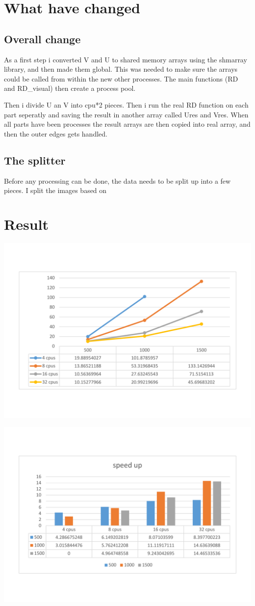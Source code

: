 \documentclass{Article}
\begin{document}
\section{What have changed}
\subsection*{Overall change}
As a first step i converted V and U to shared memory arrays using the shmarray library, and then made them global. This was needed to make sure the arrays could be called from within the new other processes. The main functions (RD and RD\_visual) then create a process pool. 

Then i divide U an V into cpu*2 pieces. Then i run the real RD function on each part seperatly and saving the result in another array called Ures and Vres. When all parts have been processes the result arrays are then copied into real array, and then the outer edges gets handled.

\subsection{The splitter}
Before any processing can be done, the data needs to be split up into a few pieces. I split the images based on 


\section{Result}



\includegraphics[scale=0.5]{plots}

\includegraphics[scale=0.5]{speedup}
\end{document}
